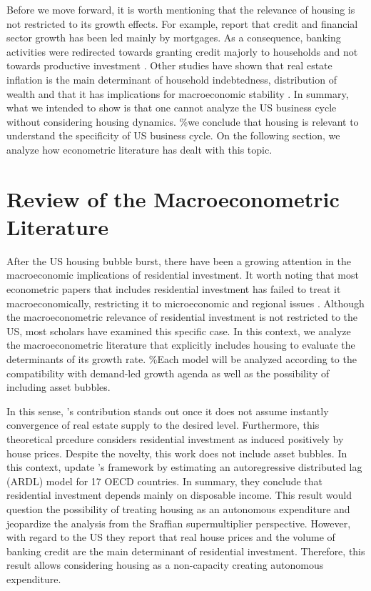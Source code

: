 \documentclass[11pt]{article}
\begin{document}
Before we move forward, it is worth mentioning that the relevance of housing is not restricted to its growth effects. 
For example, \textcite{jorda_great_2016} report that credit and financial sector growth has been led mainly by mortgages. 
As a consequence, banking activities were redirected towards granting credit majorly to households and not towards productive investment \cites{erturk_banks_2007}{kohl_more_2018}.
Other studies have shown that real estate inflation is the main determinant of household indebtedness, distribution of wealth and that it has implications for macroeconomic stability \cites{ryoo_household_2015}{stockhammer_debt-driven_2016}{barnes_private_2016}{johnston_global_2017}{mian_household_2017}{anderson_politics_2020}{fuller_housing_2020}. 
In summary, what we intended to show is that one cannot analyze the US business cycle without considering housing dynamics.
\%we conclude that housing is relevant to understand the specificity of US business cycle.
On the following section, we analyze how econometric literature has dealt with this topic.
\section{Review of the Macroeconometric Literature}
\label{sec:orga3ff370}
\label{sec:empirical_review}
After the US housing bubble burst, there have been a growing attention in the macroeconomic implications of residential investment.
It worth noting that most econometric papers that includes residential investment has failed to treat it macroeconomically, restricting it to microeconomic and regional issues \cite{arestis_u.s._2008}.
Although the macroeconometric relevance of residential investment is not restricted to the US, most scholars have examined this specific case.
In this context, we analyze the macroeconometric literature that explicitly includes housing to evaluate the determinants of its growth rate.
\%Each model will be analyzed according to the compatibility with demand-led growth agenda as well as the possibility of including asset bubbles.

In this sense, \citeauthor{poterba_tax_1984}'s \citeyear{poterba_tax_1984} contribution stands out once it does not assume instantly convergence of real estate supply to the desired level.
Furthermore, this theoretical prcedure considers residential investment as induced positively by house prices.
Despite the novelty, this work does not include asset bubbles.
In this context,  \textcite{arestis_residential_2015} update \citeauthor{poterba_tax_1984}'s \citeyear{poterba_tax_1984} framework by estimating an autoregressive distributed lag (ARDL) model for 17 OECD countries.
In summary, they conclude that residential investment depends mainly on disposable income.
This result would  question the possibility of treating housing as an autonomous expenditure and jeopardize the analysis from the Sraffian supermultiplier perspective.
However, with regard to the US they report that real house prices and the volume of banking credit are the main determinant of residential investment.
Therefore, this result allows considering housing as a non-capacity creating autonomous expenditure.
\end{document}
